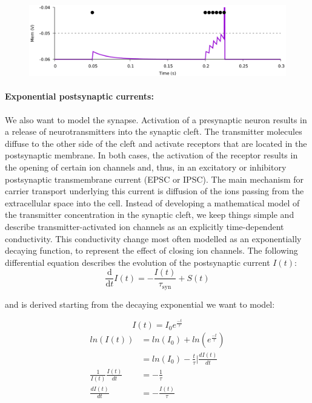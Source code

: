 \documentclass[main]{subfiles}
\begin{document}
\paragraph{}
\begin{figure}[H]
    \centering
    \includegraphics[width=0.6\linewidth]{10_DeepLearningWithSpikes/figures/leaky_ifn.png}
    \caption{}
    \label{fig:my_label}
\end{figure}
%
\paragraph{Exponential postsynaptic currents: }
We also want to model the synapse. Activation of a presynaptic neuron results in a release of neurotransmitters into the synaptic cleft. The transmitter molecules diffuse to the other side of the cleft and activate receptors that are located in the postsynaptic membrane. In both cases, the activation of the receptor results in the opening of certain ion channels and, thus, in an excitatory or inhibitory postsynaptic transmembrane current (EPSC or IPSC). The main mechanism for carrier transport underlying this current is diffusion of the ions passing from the extracellular space into the cell. Instead of developing a mathematical model of the transmitter concentration in the synaptic cleft, we keep things simple and describe transmitter-activated ion channels as an explicitly time-dependent conductivity. This conductivity change most often modelled as an exponentially decaying function, to represent the effect of closing ion channels. The following differential equation describes the evolution of the postsynaptic current $I(t)$:
%
\begin{equation}\label{eq:syn}
\frac{\mathrm{d}}{\mathrm{d} t} I(t)=-\frac{I(t)}{\tau_{\mathrm{syn}}}+S(t)
\end{equation}
%

and is derived starting from the decaying exponential we want to model:

\begin{equation}
    I(t) = I_0 e^{\frac{-t}{\tau}}
\end{equation}
\begin{align}
    ln(I(t)) &= ln(I_0) + ln(e^{\frac{-t}{\tau}}) \\
    &= ln(I_0) - \frac{t}{\tau} | \frac{dI(t)}{dt} \\
    \frac{1}{I(t)} \frac{I(t)}{dt} &= -\frac{1}{\tau} \\
    \frac{dI(t)}{dt} &= -\frac{I(t)}{\tau} 
\end{align}
\end{document}
